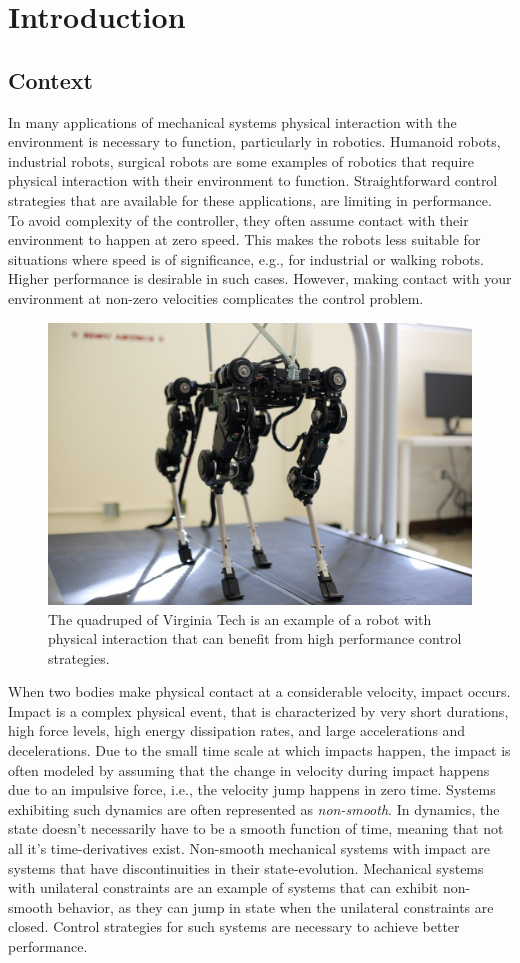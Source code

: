 \documentclass[../DC2017114Bouma.tex]{subfiles}
\begin{document}
\graphicspath{{01_Introduction/img/}}
\renewcommand{\chaptermark}[1]{\markboth{\thechapter.\ #1}{}}
\renewcommand{\sectionmark}[1]{\markright{#1}{}}
\cleartooddpage
\pagestyle{fancyreport}

\chapter{Introduction}
\section{Context}
In many applications of mechanical systems physical interaction with the environment is necessary to function, particularly in robotics. Humanoid robots, industrial robots, surgical robots are some examples of robotics that require physical interaction with their environment to function. Straightforward control strategies that are available for these applications, are limiting in performance. To avoid complexity of the controller, they often assume contact with their environment to happen at zero speed. This makes the robots less suitable for situations where speed is of significance, e.g., for industrial or walking robots. Higher performance is desirable in such cases. However, making contact with your environment at non-zero velocities complicates the control problem.

\begin{figure}[H]
\centering
\includegraphics[width=.5\textwidth]{quadruped.jpg}\caption{The quadruped of Virginia Tech is an example of a robot with physical interaction that can benefit from high performance control strategies.}\label{fig:quadrupedVT}
\end{figure}

When two bodies make physical contact at a considerable velocity, impact occurs. Impact is a complex physical event, that is characterized by very short durations, high force levels, high energy dissipation rates, and large accelerations and decelerations. Due to the small time scale at which impacts happen, the impact is often modeled by assuming that the change in velocity during impact happens due to an impulsive force, i.e., the velocity jump happens in zero time. Systems exhibiting such dynamics are often represented as \textit{non-smooth}. In dynamics, the state doesn't necessarily have to be a smooth function of time, meaning that not all it's time-derivatives exist. Non-smooth mechanical systems with impact are systems that have discontinuities in their state-evolution. Mechanical systems with unilateral constraints are an example of systems that can exhibit non-smooth behavior, as they can jump in state when the unilateral constraints are closed. Control strategies for such systems are necessary to achieve better performance. 
\end{document}
